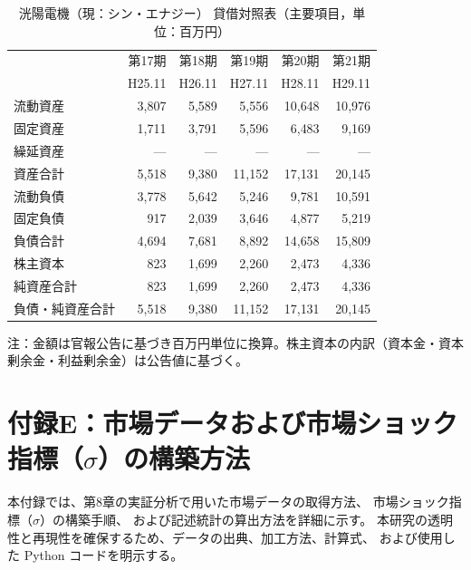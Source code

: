 \begin{table}[H]
\centering
\caption{洸陽電機（現：シン・エナジー） 貸借対照表（主要項目，単位：百万円）}
\begin{tabular}{lrrrrr}
\toprule
 & 第17期 & 第18期 & 第19期 & 第20期 & 第21期 \\
 & H25.11 & H26.11 & H27.11 & H28.11 & H29.11 \\
\midrule
流動資産       & 3{,}807 & 5{,}589 & 5{,}556 & 10{,}648 & 10{,}976 \\
固定資産       & 1{,}711 & 3{,}791 & 5{,}596 & 6{,}483 & 9{,}169 \\
繰延資産       & —       & —       & —       & —       & — \\
\midrule
資産合計       & 5{,}518 & 9{,}380 & 11{,}152 & 17{,}131 & 20{,}145 \\
\midrule
流動負債       & 3{,}778 & 5{,}642 & 5{,}246 & 9{,}781 & 10{,}591 \\
固定負債       & 917     & 2{,}039 & 3{,}646 & 4{,}877 & 5{,}219 \\
負債合計       & 4{,}694 & 7{,}681 & 8{,}892 & 14{,}658 & 15{,}809 \\
\midrule
株主資本       & 823     & 1{,}699 & 2{,}260 & 2{,}473 & 4{,}336 \\
純資産合計     & 823     & 1{,}699 & 2{,}260 & 2{,}473 & 4{,}336 \\
\midrule
負債・純資産合計 & 5{,}518 & 9{,}380 & 11{,}152 & 17{,}131 & 20{,}145 \\
\bottomrule
\end{tabular}
\end{table}

\begin{flushleft}
\footnotesize
注：金額は官報公告に基づき百万円単位に換算。株主資本の内訳（資本金・資本剰余金・利益剰余金）は公告値に基づく。
\end{flushleft}

\chapter*{付録E：市場データおよび市場ショック指標（$\sigma$）の構築方法}

本付録では、第8章の実証分析で用いた市場データの取得方法、
市場ショック指標（$\sigma$）の構築手順、
および記述統計の算出方法を詳細に示す。
本研究の透明性と再現性を確保するため、データの出典、加工方法、計算式、
および使用した Python コードを明示する。

